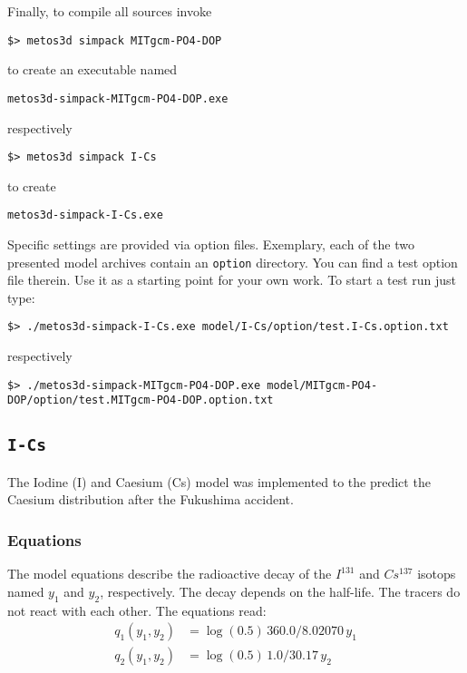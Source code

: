 \documentclass{article}
\begin{document}
Finally,
to compile all sources invoke
%
\begin{verbatim}
$> metos3d simpack MITgcm-PO4-DOP
\end{verbatim}
%
to create an executable named
%
\begin{verbatim}
metos3d-simpack-MITgcm-PO4-DOP.exe
\end{verbatim}
%
respectively
%
\begin{verbatim}
$> metos3d simpack I-Cs
\end{verbatim}
%
to create
%
\begin{verbatim}
metos3d-simpack-I-Cs.exe
\end{verbatim}



Specific settings are provided via option files.
%
Exemplary,
each of the two presented model archives contain an \texttt{option} directory.
%
You can find a test option file therein.
%
Use it as a starting point for your own work.
%
To start a test run just type:
%
\small
\begin{verbatim}
$> ./metos3d-simpack-I-Cs.exe model/I-Cs/option/test.I-Cs.option.txt
\end{verbatim}
%
respectively
%
\begin{verbatim}
$> ./metos3d-simpack-MITgcm-PO4-DOP.exe model/MITgcm-PO4-DOP/option/test.MITgcm-PO4-DOP.option.txt
\end{verbatim}
\normalsize


%
%
\subsection{\texttt{I-Cs}}

The Iodine (I) and Caesium (Cs) model was implemented to the predict
the Caesium distribution after the Fukushima accident.

%
%
\subsubsection{Equations}

The model equations describe the radioactive decay of the $I^{131}$ and $Cs^{137}$
isotops named $y_1$ and $y_2$, respectively. The decay depends on the
half-life. The tracers do not react with each other. The equations read:
\begin{align*}
q_1(y_1, y_2)	& = \log(0.5) \, 360.0 / 8.02070 \, y_1 \\
q_2(y_1, y_2)	& = \log(0.5) \, 1.0 / 30.17 \, y_2
\end{align*}
\end{document}
